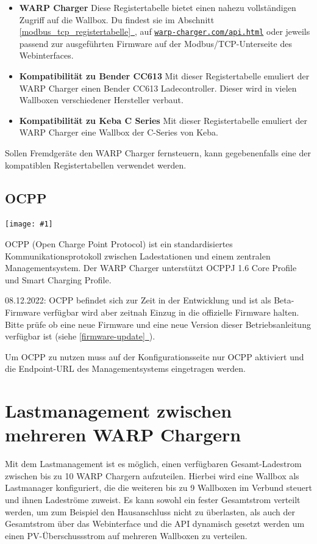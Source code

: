 \documentclass[a4paper,10pt]{article}
\newcommand{\hint}[1]{\begin{tcolorbox}[colback=boxgray,colframe=black,coltext=
white,title=Hinweis,left*=2mm,right*=2mm,boxsep=1mm,bottom=1mm,top=1mm]#1\end{tcolorbox}}
\newcommand{\gfx}[1]{\texttt{[image: \#1]}}
\newcommand*{\fullref}[1]{\hyperref[{#1}]{\ref*{#1}~\nameref*{#1}}}
\newcommand\rurl[2]{%
  \href{#1}{\nolinkurl{#2}}%
}
\begin{document}
\begin{multicols*}{2}
	\begin{itemize}
		\item \textbf{WARP Charger} Diese Registertabelle bietet einen nahezu vollständigen Zugriff auf die Wallbox.
				Du findest sie im Abschnitt \fullref{modbus_tcp_registertabelle}, auf \rurl{https://warp-charger.com/api.html}{warp-charger.com/api.html} oder
				jeweils passend zur ausgeführten Firmware auf der Modbus/TCP-Unterseite des Webinterfaces.
		\item \textbf{Kompatibilität zu Bender CC613} Mit dieser Registertabelle emuliert der WARP Charger einen Bender CC613 Ladecontroller. Dieser wird in vielen Wallboxen verschiedener Hersteller verbaut.
		\item \textbf{Kompatibilität zu Keba C Series} Mit dieser Registertabelle emuliert der WARP Charger eine Wallbox der C-Series von Keba.
	\end{itemize}

	Sollen Fremdgeräte den WARP Charger fernsteuern, kann gegebenenfalls eine der
	kompatiblen Registertabellen verwendet werden.

	\subsection{OCPP}

	\gfx{./img_warp2/resized/web_ocpp}

	OCPP (Open Charge Point Protocol) ist ein standardisiertes Kommunikationsprotokoll zwischen
	Ladestationen und einem zentralen Managementsystem. Der WARP Charger
	unterstützt OCPPJ 1.6 Core Profile und Smart Charging Profile.

	\hint{08.12.2022: OCPP befindet sich zur Zeit in der Entwicklung und ist als
	Beta-Firmware verfügbar wird aber zeitnah Einzug in die offizielle Firmware
	halten. Bitte prüfe ob eine neue Firmware und eine neue Version dieser
	Betriebsanleitung verfügbar ist (siehe \fullref{firmware-update}).}

	Um OCPP zu nutzen muss auf der Konfigurationsseite nur OCPP aktiviert und die
	Endpoint-URL des Managementsystems eingetragen werden.


	\newpage
	\section{Lastmanagement zwischen mehreren WARP Chargern}\label{charge_manager}
	Mit dem Lastmanagement ist es möglich, einen verfügbaren Gesamt-Ladestrom zwischen bis zu 10 WARP Chargern aufzuteilen.
	Hierbei wird eine Wallbox als Lastmanager konfiguriert, die die weiteren bis zu 9 Wallboxen im Verbund steuert und ihnen Ladeströme
	zuweist. Es kann sowohl ein fester Gesamtstrom verteilt werden, um zum Beispiel den Hausanschluss nicht zu überlasten,
	als auch der Gesamtstrom über das Webinterface und die API dynamisch gesetzt werden
	um einen PV-Überschussstrom auf mehreren Wallboxen zu verteilen.


\end{multicols*}
\end{document}
